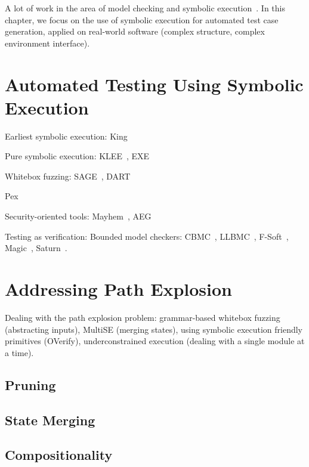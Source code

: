 A lot of work in the area of model checking and symbolic execution~\cite{jhala2009software, woodcock2009formal}.  In this chapter, we focus on the use of symbolic execution for automated test case generation, applied on real-world software (complex structure, complex environment interface).

\section{Automated Testing Using Symbolic Execution}

Earliest symbolic execution: King~\cite{king:symbolic:2, boyer:symbolic}

Pure symbolic execution: KLEE~\cite{klee}, EXE~\cite{exe}

Whitebox fuzzing: SAGE~\cite{sage2012,godefroid:fuzz}, DART~\cite{dart}

Pex~\cite{tillmann-pex}

Security-oriented tools: Mayhem~\cite{mayhem}, AEG~\cite{aeg}

Testing as verification: Bounded model checkers: CBMC~\cite{cbmc}, LLBMC~\cite{llbmc2012}, F-Soft~\cite{f-soft}, Magic~\cite{magic}, Saturn~\cite{saturn}.


\section{Addressing Path Explosion}

Dealing with the path explosion problem: grammar-based whitebox fuzzing (abstracting inputs), MultiSE (merging states), using symbolic execution friendly primitives (OVerify), underconstrained execution (dealing with a single module at a time).

\subsection{Pruning}

\subsection{State Merging}

\subsection{Compositionality}

